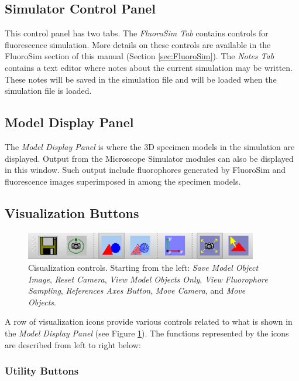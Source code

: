 \documentclass[11pt,titlepage,twoside]{article}
\begin{document}
\subsection{Simulator Control Panel}

This control panel has two tabs. The \emph{FluoroSim Tab} contains controls for fluorescence simulation. More details on these controls are available in the FluoroSim section of this manual (Section \ref{sec:FluoroSim}). The \emph{Notes Tab} contains a text editor where notes about the current simulation may be written. These notes will be saved in the simulation file and will be loaded when the simulation file is loaded.

\subsection{Model Display Panel}

The \emph{Model Display Panel} is where the 3D specimen models in the simulation are displayed. Output from the Microscope Simulator modules can also be displayed in this window. Such output include fluorophores generated by FluoroSim and fluorescence images superimposed in among the specimen models.

\subsection{Visualization Buttons}

\begin{figure}[htbp] %
   \centering
   \includegraphics[width=4in]{images/VisualizationIcons} 
   \caption{Cisualization controls. Starting from the left: \emph{Save Model Object Image}, \emph{Reset Camera}, \emph{View Model Objects Only}, \emph{View Fluorophore Sampling}, \emph{References Axes Button}, \emph{Move Camera}, and \emph{Move Objects}.}
   \label{fig:VisualizationControls}
\end{figure}

A row of visualization icons provide various controls related to what is shown in the \emph{Model Display Panel} (see Figure \ref{fig:VisualizationControls}). The functions represented by the icons are described from left to right below:

\subsubsection{Utility Buttons}
\end{document}
